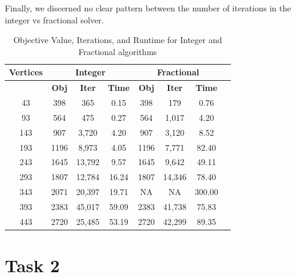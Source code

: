 \documentclass[12pt]{article}
\numberwithin{equation}{section}
\begin{document}
 Finally, we discerned no clear pattern between the number of iterations in the integer vs fractional solver.

\vspace{1em}
\begin{table}[!ht]
\centering
\begin{tabular}{|c|c|c|c|c|c|c|c|}
\hline
\textbf{Vertices} & \multicolumn{3}{c|}{\textbf{Integer}} & \multicolumn{3}{c|}{\textbf{Fractional}} \\
\hline
 & \textbf{Obj} & \textbf{Iter} & \textbf{Time} & \textbf{Obj} & \textbf{Iter} & \textbf{Time} \\
\hline
      43 &           398 &            365 &           0.15 &              398 &               179 &              0.76 \\
      93 &           564 &            475 &           0.27 &              564 &             1,017 &              4.20 \\
     143 &           907 &          3,720 &           4.20 &              907 &             3,120 &              8.52 \\
     193 &          1196 &          8,973 &           4.05 &             1196 &             7,771 &             82.40 \\
     243 &          1645 &         13,792 &           9.57 &             1645 &             9,642 &             49.11 \\
     293 &          1807 &         12,784 &          16.24 &             1807 &            14,346 &             78.40 \\
     343 &          2071 &         20,397 &          19.71 &                NA &                 NA &            300.00 \\
     393 &          2383 &         45,017 &          59.09 &             2383 &            41,738 &             75.83 \\
     443 &          2720 &         25,485 &          53.19 &             2720 &            42,299 &             89.35 \\
\hline
\end{tabular}
\caption{Objective Value, Iterations, and Runtime for Integer and Fractional algorithms}
\label{table:separated_comparison}
\end{table}

\vspace{1em} 

\newpage
\section{Task 2}
\end{document}
